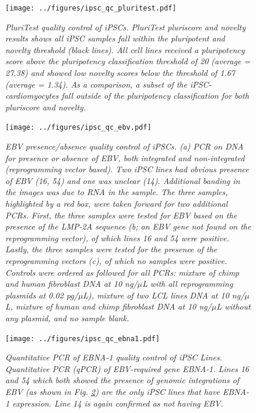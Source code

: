 \documentclass{article}
\begin{document}
\begin{figure}[h]
\begin{center}
    \texttt{[image: ../figures/ipsc\_qc\_pluritest.pdf]} 
    \caption{\it{PluriTest quality control of iPSCs. PluriTest pluriscore and novelty results shows all iPSC samples fall within the pluripotent and novelty threshold (black lines). All cell lines received a pluripotency score above the pluripotency classification threshold of 20 (average = 27.38) and showed low novelty scores below the threshold of 1.67 (average = 1.34). As a comparison, a subset of the iPSC-cardiomyocytes fall outside of the pluripotency classification for both pluriscore and novelty.}}
    \label{fig:ipsc_qc_pluritest}
    \end{center}
\end{figure}

\begin{figure}[h]
\begin{center}
    \texttt{[image: ../figures/ipsc\_qc\_ebv.pdf]} 
    \caption{\it{EBV presence/absence quality control of iPSCs. (a) PCR on DNA for presence or absence of EBV, both integrated and non-integrated (reprogramming vector based). Two iPSC lines had obvious presence of EBV (16, 54) and one was unclear (14). Additional banding in the images was due to RNA in the sample. The three samples, highlighted by a red box, were taken forward for two additional PCRs. First, the three samples were tested for EBV based on the presence of the LMP-2A sequence (b; an EBV gene not found on the reprogramming vector), of which lines 16 and 54 were positive. Lastly, the three samples were tested for the presence of the reprogramming vectors (c), of which no samples were positive. Controls were ordered as followed for all PCRs: mixture of chimp and human fibroblast DNA at 10 ng/$\mu$L with all reprogramming plasmids at 0.02 pg/$\mu$L), mixture of two LCL lines DNA at 10 ng/$\mu$L, mixture of human and chimp fibroblast DNA at 10 ng/$\mu$L without any plasmid, and no sample blank.}}
    \label{fig:ipsc_qc_ebv}
    \end{center}
\end{figure}


\begin{figure}[h]
\begin{center}
    \texttt{[image: ../figures/ipsc\_qc\_ebna1.pdf]} 
    \caption{\it{Quantitative PCR of EBNA-1 quality control of iPSC Lines. Quantitative PCR (qPCR) of EBV-required gene EBNA-1. Lines 16 and 54 which both showed the presence of genomic integrations of EBV (as shown in Fig. \ref{fig:ipsc_qc_ebv}) are the only iPSC lines that have EBNA-1 expression. Line 14 is again confirmed as not having EBV.}}
    \label{fig:ipsc_qc_ebna1}
    \end{center}
\end{figure}
\end{document}
